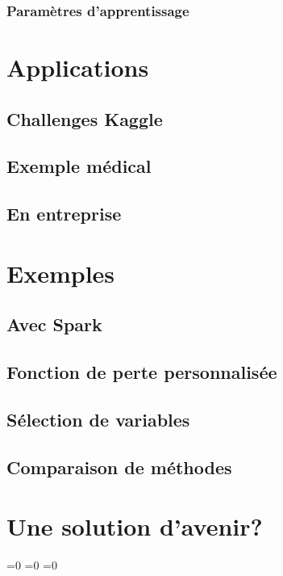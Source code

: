 \documentclass[11pt,a4paper]{article}
\begin{document}
\subsubsection{Paramètres d'apprentissage}

\section{Applications}
\subsection{Challenges Kaggle}
\subsection{Exemple médical}
\subsection{En entreprise}

\section{Exemples}
\subsection{Avec Spark}
\subsection{Fonction de perte personnalisée}
\subsection{Sélection de variables}
\subsection{Comparaison de méthodes}

\section{Une solution d'avenir?}

%
%

\makeatletter
\ifnum{}=0
\clearpage
\else\ifnum{}=0
\clearpage
\else\ifnum{}=0
\clearpage
\fi\fi\fi

\renewcommand{\sectionbreak}{}
\end{document}
